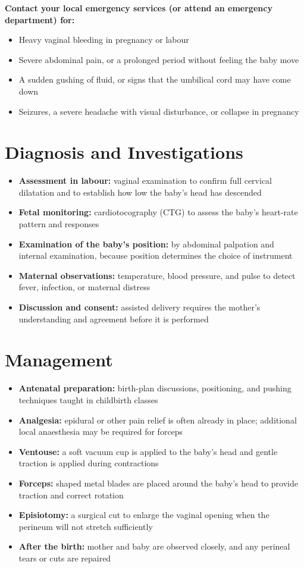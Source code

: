 \textbf{Contact your local emergency services (or attend an emergency department) for:}
\begin{itemize}
    \item Heavy vaginal bleeding in pregnancy or labour
    \item Severe abdominal pain, or a prolonged period without feeling the baby move
    \item A sudden gushing of fluid, or signs that the umbilical cord may have come down
    \item Seizures, a severe headache with visual disturbance, or collapse in pregnancy
\end{itemize}

\section*{Diagnosis and Investigations}
\begin{itemize}
    \item \textbf{Assessment in labour:} vaginal examination to confirm full cervical dilatation and to establish how low the baby's head has descended
    \item \textbf{Fetal monitoring:} cardiotocography (CTG) to assess the baby's heart-rate pattern and responses
    \item \textbf{Examination of the baby's position:} by abdominal palpation and internal examination, because position determines the choice of instrument
    \item \textbf{Maternal observations:} temperature, blood pressure, and pulse to detect fever, infection, or maternal distress
    \item \textbf{Discussion and consent:} assisted delivery requires the mother's understanding and agreement before it is performed
\end{itemize}

\section*{Management}
\begin{itemize}
    \item \textbf{Antenatal preparation:} birth-plan discussions, positioning, and pushing techniques taught in childbirth classes
    \item \textbf{Analgesia:} epidural or other pain relief is often already in place; additional local anaesthesia may be required for forceps
    \item \textbf{Ventouse:} a soft vacuum cup is applied to the baby's head and gentle traction is applied during contractions
    \item \textbf{Forceps:} shaped metal blades are placed around the baby's head to provide traction and correct rotation
    \item \textbf{Episiotomy:} a surgical cut to enlarge the vaginal opening when the perineum will not stretch sufficiently
    \item \textbf{After the birth:} mother and baby are observed closely, and any perineal tears or cuts are repaired
\end{itemize}

